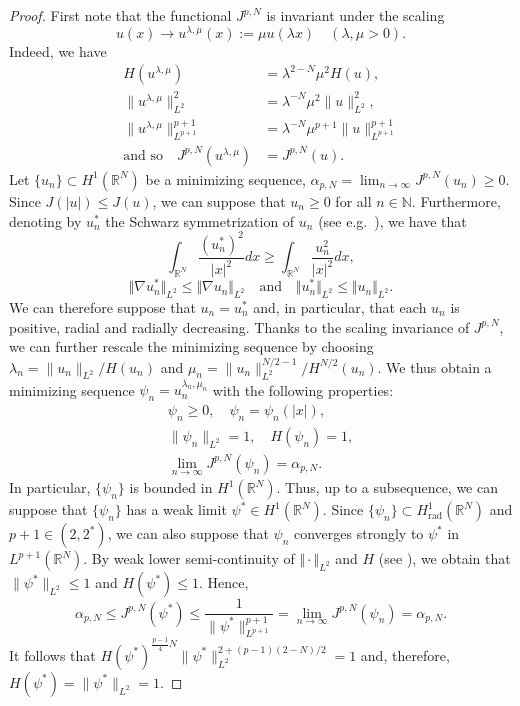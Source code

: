 \documentclass[reqno]{amsart}
\newcommand{\real}{\mathbb{R}}
\newcommand{\rn}{\real^N}
\newcommand{\intrn}{\int_{\real^N}}
\newcommand{\N}{\mathbb{N}}
\let\le=\leqslant
\let\ge= \geqslant
\theoremstyle{plain}
\theoremstyle{definition}
\numberwithin{equation}{section}
\begin{document}

\begin{proof}
First note that the functional $J^{p,N}$ is invariant under the scaling 
\[
u(x) \to u^{\lambda,\mu}(x):=\mu u(\lambda x) \quad (\lambda,\mu>0).
\]
Indeed, we have
\begin{align*}
H (u^{\lambda,\mu})&=\lambda^{2-N}\mu^2 H (u),\\
\|u^{\lambda,\mu}\|_{L^2}^2&=\lambda^{-N}\mu^2\|u\|^2_{L^2},\\
\|u^{\lambda,\mu}\|^{p+1}_{L^{p+1}}&=\lambda^{-N}\mu^{p+1}\|u\|^{p+1}_{L^{p+1}}\\
\text{and so} \quad J^{p,N}(u^{\lambda,\mu})&=J^{p,N}(u).
\end{align*}
Let $\{u_n\}\subset H^1(\rn)$ be a minimizing sequence,
$\alpha_{p,N} = \lim_{n\rightarrow\infty} J^{p,N}(u_n)\ge0$. 
Since $J(|u|)\le J(u)$, we can suppose that $u_n\ge0$ for all $n\in\N$. Furthermore,
denoting by $u_n^*$ the Schwarz symmetrization of $u_n$ (see e.g.~\cite[pp.~80-83]{Lieb}),
we have that
\[
\intrn \frac{(u_n^*)^{2}}{|x|^2} dx \ge \intrn \frac{u_n^{2}}{|x|^2} dx,
\]
\[
\Vert \nabla u_n^*\Vert_{L^2}\le \Vert \nabla u_n\Vert_{L^2}
\quad\text{and}\quad
\Vert u_n^*\Vert_{L^2}\le\Vert u_n\Vert_{L^2}.
\]
We can therefore suppose that $u_n=u_n^*$ and, in particular, that each $u_n$ is positive,
radial and radially decreasing.
Thanks to the scaling invariance of $J^{p,N}$, 
we can further rescale the minimizing sequence by choosing 
$\lambda_n=\|u_n\|_{L^2}/H(u_n) $ and $\mu_n=\|u_n\|_{L^2}^{N/2-1}/H^{N/2}(u_n)$. 
We thus obtain a minimizing sequence $\psi_n=u_n^{\lambda_n,\mu_n}$ 
with the following properties:
\begin{align*}
\psi_n \ge 0, \quad \psi_n=\psi_n(|x|),\\
\|\psi_n\|_{L^2}=1, \quad H(\psi_n)=1,\\
\lim_{n\rightarrow\infty} J^{p,N}(\psi_n)=\alpha_{p,N}.
\end{align*}
In particular, $\{\psi_n\}$ is bounded in $H^1(\rn)$.
Thus, up to a subsequence, we can suppose that $\{\psi_n\}$ has a weak limit 
$\psi^* \in H^1(\rn)$.
Since $\{\psi_n\}\subset H^1_\mathrm{rad}(\rn)$ and $p+1\in(2,2^*)$, we can also suppose that
$\psi_n$ converges strongly to $\psi^*$ in $L^{p+1}(\rn)$. 
By weak lower semi-continuity of $\Vert\cdot\Vert_{L^2}$ and $H$ (see \cite{montefusco}), 
we obtain that $\|\psi^*\|_{L^2}\le 1$ and $H(\psi^*)\le 1$. Hence,
\[
\alpha_{p,N}\le J^{p,N}(\psi^*)\le \frac{1}{\|\psi^*\|^{p+1}_{L^{p+1}}}=\lim_{n\rightarrow\infty}J^{p,N}(\psi_n)=\alpha_{p,N}.
\]
It follows that $H(\psi^*)^{\frac{p-1}{4}N}\|\psi^*\|_{L^2}^{2+(p-1)(2-N)/2}=1$ and, 
therefore, $H(\psi^*)=\|\psi^*\|_{L^2}=1$.


\end{proof}
\end{document}
